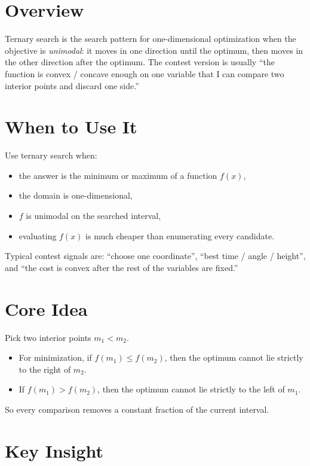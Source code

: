\section*{Overview}

Ternary search is the search pattern for one-dimensional optimization when the objective is \emph{unimodal}: it moves
in one direction until the optimum, then moves in the other direction after the optimum. The contest version is usually
``the function is convex / concave enough on one variable that I can compare two interior points and discard one side.''

\section*{When to Use It}

Use ternary search when:

\begin{itemize}
  \item the answer is the minimum or maximum of a function \(f(x)\),
  \item the domain is one-dimensional,
  \item \(f\) is unimodal on the searched interval,
  \item evaluating \(f(x)\) is much cheaper than enumerating every candidate.
\end{itemize}

Typical contest signals are: ``choose one coordinate'', ``best time / angle / height'', and ``the cost is convex after
the rest of the variables are fixed.''

\section*{Core Idea}

Pick two interior points \(m_1 < m_2\).

\begin{itemize}
  \item For minimization, if \(f(m_1) \le f(m_2)\), then the optimum cannot lie strictly to the right of \(m_2\).
  \item If \(f(m_1) > f(m_2)\), then the optimum cannot lie strictly to the left of \(m_1\).
\end{itemize}

So every comparison removes a constant fraction of the current interval.

\section*{Key Insight}

